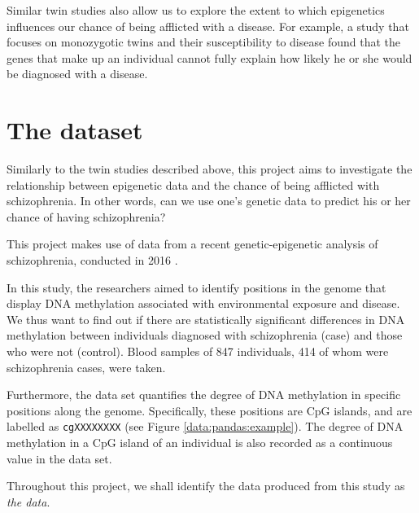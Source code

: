 \documentclass[12pt, twoside, a4paper]{report}
\begin{document}
Similar twin studies also allow us to explore the extent to which epigenetics influences our chance of being afflicted with a disease. For example, a study \cite{RefWorks:105} that focuses on monozygotic twins and their susceptibility to disease found that the genes that make up an individual cannot fully explain how likely he or she would be diagnosed with a disease.

\section{The dataset} \label{bg_genetic_data}

Similarly to the twin studies described above, this project aims to investigate the relationship between epigenetic data and the chance of being afflicted with schizophrenia. In other words, can we use one's genetic data to predict his or her chance of having schizophrenia?

This project makes use of data from a recent genetic-epigenetic analysis of schizophrenia, conducted in 2016 \cite{RefWorks:78}.


In this study, the researchers aimed to identify positions in the genome that display DNA methylation associated with environmental exposure and disease. We thus want to find out if there are statistically significant differences in DNA methylation between individuals diagnosed with schizophrenia (case) and those who were not (control). Blood samples of 847 individuals, 414 of whom were schizophrenia cases, were taken.

Furthermore, the data set quantifies the degree of DNA methylation in specific positions along the genome. Specifically, these positions are CpG islands, and are labelled as \texttt{cgXXXXXXXX} (see Figure \ref{data:pandas:example}). The degree of DNA methylation in a CpG island of an individual is also recorded as a continuous value in the data set.


Throughout this project, we shall identify the data produced from this study as \textit{the data}.
\end{document}
